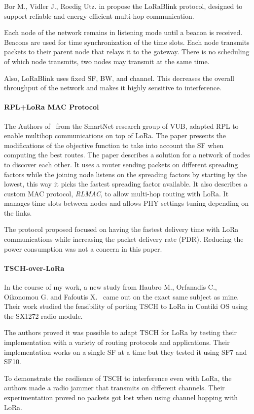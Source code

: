 Bor M., Vidler J., Roedig Utz. in \cite{lorablink} propose the LoRaBlink
protocol, designed to support reliable and energy efficient multi-hop
communication.

Each node of the network remains in listening mode until a beacon is received.
Beacons are used for time synchronization of the time slots.
Each node transmits packets to their parent node that relays it to the gateway.
There is no scheduling of which node transmits, two nodes may
transmit at the same time.


Also, LoRaBlink uses fixed SF, BW, and channel. This decreases the overall throughput 
of the network and makes it highly sensitive to interference.

\paragraph{RPL+LoRa MAC Protocol}

The Authors of~\cite{8115756} from the SmartNet research group of VUB, adapted RPL 
to enable multihop communications on top of LoRa. 
The paper presents the modifications of the objective function to take into
account the SF when computing the best routes.
The paper describes a solution for a network of nodes to discover each other.
It uses a router sending packets on different spreading factors while the joining
node listens on the spreading factors by starting by the lowest, this way it
picks the fastest spreading factor available.
It also describes a custom MAC protocol, \emph{RLMAC}, to allow multi-hop
routing with LoRa. It manages time slots between nodes and allows PHY settings
tuning depending on the links.

The protocol proposed focused on having the fastest delivery time with LoRa
communications while increasing the packet delivery rate (PDR).
Reducing the power consumption was not a concern in this paper.


\paragraph{TSCH-over-LoRa}

In the course of my work, a new study from Haubro M., Orfanadis C.,
Oikonomou G. and Fafoutis X.~\cite{tschoverlora} came out on the exact 
same subject as mine. 
Their work studied the feasibility of porting TSCH to LoRa in Contiki OS using
the SX1272 radio module.

The authors proved it was possible to adapt TSCH for LoRa by testing their
implementation with a variety of routing protocols and applications.
Their implementation works on a single SF at a time but they tested it using
SF7 and SF10.

To demonstrate the resilience of TSCH to interference even with LoRa, the
authors made a radio jammer that transmits on different channels. Their
experimentation proved no packets got lost when using channel hopping with
LoRa.
